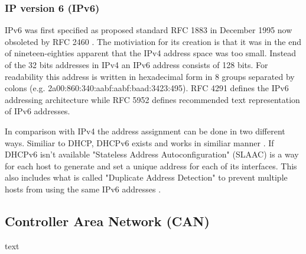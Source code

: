 \subsubsection{IP version 6 (IPv6)}
IPv6 was first specified as proposed standard RFC 1883 \cite{web:rfc1883} in
December 1995 now obsoleted by RFC 2460 \cite{web:rfc2460}. The motiviation for
its creation is that it was in the end of nineteen-eighties apparent that the
IPv4 address space was too small. Instead of the 32 bits addresses in IPv4 an
IPv6 address consists of 128 bits. For readability this address is
written in hexadecimal form in 8 groups separated by colons
(e.g. 2a00:860:340:aabf:aabf:baad:3423:495). RFC 4291 defines the IPv6
addressing architecture \cite{web:rfc4291} while RFC 5952 \cite{web:rfc5952}
defines recommended text representation of IPv6 addresses.

In comparison with IPv4 the address assignment can be done in two different
ways. Similiar to DHCP, DHCPv6 exists and works in similiar manner
\cite{web:rfc3315}. If DHCPv6 isn't available "Stateless Address
Autoconfiguration" (SLAAC) is a way for each host to generate and set a unique
address for each of its interfaces.
This also includes what is called "Duplicate Address Detection" to prevent
multiple hosts from using the same IPv6 addresses \cite{web:rfc4862, web:rfc4941}.

\subsection{Controller Area Network (CAN)}
text
